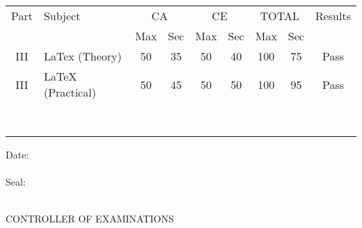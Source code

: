 \documentclass[12pt]{report}
\begin{document}
	\begin{table}[h]
		\renewcommand{\arraystretch}{1.5}
		\begin{center}
			\begin{tabular}{|c|>{\centering}p{8.0cm}|c|c|c|c|c|c|c|}
				\hline
				Part & Subject &\multicolumn{2}{c|}{CA} & \multicolumn{2}{c|}{CE}
				& \multicolumn{2}{c|}{TOTAL} & Results \\ \cline{3-8} & & Max & Sec & Max & Sec & Max & Sec
				&\\ \hline
				
				III & \raggedright LaTex (Theory) & 50 & 35 & 50 & 40 & 100 & 75 &
				
				Pass\\
				
				III & \raggedright LaTeX (Practical) &50 &45 & 50 & 50 & 100 & 95 &
				
				Pass\\
				
				& & & & & & & & \\
				& & & & & & & & \\
				& & & & & & & & \\
				& & & & & & & & \\
				& & & & & & & & \\
				& & & & & & & & \\
				& & & & & & & & \\
				& & & & & & & & \\
				\hline
			\end{tabular}
		\end{center}
	\end{table}
    	Date: \\ \\
	
	Seal: \\ \\
	
	\begin{flushright}
		CONTROLLER OF EXAMINATIONS
	\end{flushright}
\end{document}
